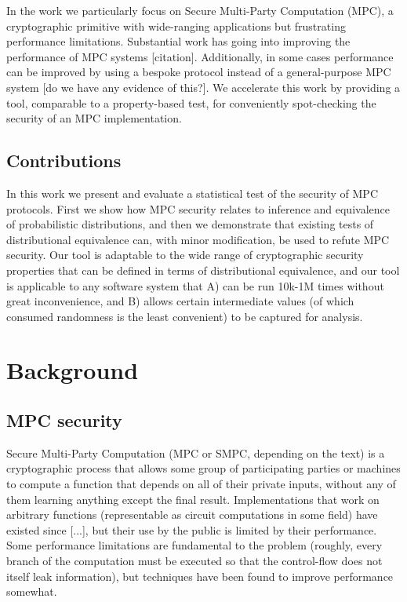 \documentclass[conference]{IEEEtran}
\begin{document}
In the work we particularly focus on Secure Multi-Party Computation (MPC),
a cryptographic primitive with wide-ranging applications but frustrating performance limitations.
Substantial work has going into improving the performance of MPC systems [citation].
Additionally, in some cases performance can be improved by using a bespoke protocol instead of a general-purpose MPC system [do we have any evidence of this?].
We accelerate this work by providing a tool, comparable to a property-based test,
for conveniently spot-checking the security of an MPC implementation.

\subsection{Contributions}

In this work we present and evaluate a statistical test of the security of MPC protocols.
First we show how MPC security relates to inference and equivalence of probabilistic distributions,
and then we demonstrate that existing tests of distributional equivalence can, with minor modification, be used to refute MPC security.
Our tool is adaptable to the wide range of cryptographic security properties that can be defined in terms of distributional equivalence,
and our tool is applicable to any software system that
A) can be run 10k-1M times without great inconvenience, and
B) allows certain intermediate values (of which consumed randomness is the least convenient) to be captured for analysis.

\section{Background}

\subsection{MPC security}

Secure Multi-Party Computation (MPC or SMPC, depending on the text)
is a cryptographic process that allows some group of participating parties or machines
to compute a function that depends on all of their private inputs,
without any of them learning anything except the final result.
Implementations that work on arbitrary functions (representable as circuit computations in some field)
have existed since [...],
but their use by the public is limited by their performance.
Some performance limitations are fundamental to the problem
(roughly, every branch of the computation must be executed so that the control-flow does not itself leak information),
but techniques have been found to improve performance somewhat.
\end{document}
